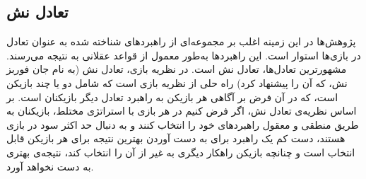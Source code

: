 \subsection{تعادل نش}
پژوهش‌ها در این زمینه اغلب بر مجموعه‌ای از راهبردهای شناخته شده به عنوان تعادل در بازی‌ها استوار است. این راهبردها به‌طور معمول از قواعد عقلانی به نتیجه می‌رسند. مشهورترین تعادل‌ها، تعادل نش است. در نظریه بازی، تعادل نش (به نام جان فوربز نش، که آن را پیشنهاد کرد) راه حلی از نظریه بازی است که شامل دو یا چند بازیکن است، که در آن فرض بر آگاهی هر بازیکن به راهبرد تعادل دیگر بازیکنان است. بر اساس نظریه‌ی تعادل نش، اگر فرض کنیم در هر بازی با استراتژی مختلط، بازیکنان به طریق منطقی و معقول راهبردهای خود را انتخاب کنند و به دنبال حد اکثر سود در بازی هستند، دست کم یک راهبرد برای به دست آوردن بهترین نتیجه برای هر بازیکن قابل انتخاب است و چنانچه بازیکن راهکار دیگری به غیر از آن را انتخاب کند، نتیجه‌ی بهتری به دست نخواهد آورد.



